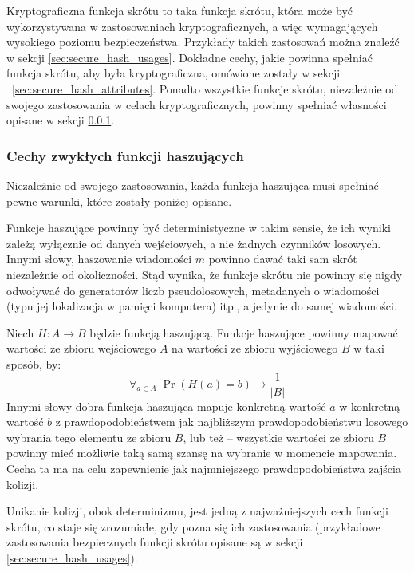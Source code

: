 \documentclass[12pt,a4paper,twoside]{article}
\begin{document}
Kryptograficzna funkcja skrótu to taka funkcja skrótu, która może być
wykorzystywana w zastosowaniach kryptograficznych, a więc wymagających
wysokiego poziomu bezpieczeństwa. Przykłady takich zastosowań można znaleźć w
sekcji \ref{sec:secure_hash_usages}. Dokładne cechy, jakie powinna spełniać
funkcja skrótu, aby była kryptograficzna, omówione zostały w sekcji
~\ref{sec:secure_hash_attributes}. Ponadto wszystkie funkcje skrótu,
niezależnie od swojego zastosowania w celach kryptograficznych, powinny
spełniać własności opisane w sekcji \ref{sec:common_hash_attributes}.



\subsubsection{Cechy zwykłych funkcji haszujących}
\label{sec:common_hash_attributes}
Niezależnie od swojego zastosowania, każda funkcja haszująca musi spełniać
pewne warunki, które zostały poniżej opisane.

Funkcje haszujące powinny być deterministyczne w takim sensie, że ich wyniki
zależą wyłącznie od danych wejściowych, a nie żadnych czynników losowych.
Innymi słowy, haszowanie wiadomości $m$ powinno dawać taki sam skrót
niezależnie od okoliczności. Stąd wynika, że funkcje skrótu nie powinny się
nigdy odwoływać do generatorów liczb pseudolosowych, metadanych o wiadomości
(typu jej lokalizacja w pamięci komputera) itp., a jedynie do samej wiadomości.

Niech $H : A \to B$ będzie funkcją haszującą. Funkcje haszujące powinny mapować
wartości ze zbioru wejściowego $A$ na wartości ze zbioru wyjściowego $B$ w taki
sposób, by:
\[
    \forall_{a \in A} \; \Pr(H(a) = b) \to \frac{1}{|B|}
\]
Innymi słowy dobra funkcja haszująca mapuje konkretną wartość $a$ w konkretną
wartość $b$ z prawdopodobieństwem jak najbliższym prawdopodobieństwu losowego
wybrania tego elementu ze zbioru $B$, lub też -- wszystkie wartości ze zbioru
$B$ powinny mieć możliwie taką samą szansę na wybranie w momencie mapowania.
Cecha ta ma na celu zapewnienie jak najmniejszego prawdopodobieństwa zajścia
kolizji.

Unikanie kolizji, obok determinizmu, jest jedną z najważniejszych cech funkcji
skrótu, co staje się zrozumiałe, gdy pozna się ich zastosowania (przykładowe
zastosowania bezpiecznych funkcji skrótu opisane są w sekcji
\ref{sec:secure_hash_usages}).
\end{document}
